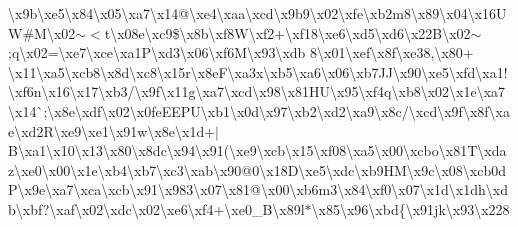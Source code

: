 \begin{DoxyCompactItemize}
\textbackslash{}x9b\textbackslash{}xe5\textbackslash{}x84\textbackslash{}x05\textbackslash{}xa7\textbackslash{}x14@\textbackslash{}xe4\textbackslash{}xaa\textbackslash{}xcd\textbackslash{}x9b9\textbackslash{}x02\textbackslash{}xfe\textbackslash{}xb2m8\textbackslash{}x89\textbackslash{}x04\textbackslash{}x16\+UW\#M\textbackslash{}x02$\sim$$<$t\textbackslash{}x08e\textbackslash{}xc9\$\textbackslash{}x8b\textbackslash{}xf8\+W\textbackslash{}xf2+\textbackslash{}xf18\textbackslash{}xe6\textbackslash{}xd5\textbackslash{}xd6\textbackslash{}x22\+B\textbackslash{}x02$\sim$;q\textbackslash{}x02=\textbackslash{}xe7\textbackslash{}xce\textbackslash{}xa1\+P\textbackslash{}xd3\textbackslash{}x06\textbackslash{}xf6\+M\textbackslash{}x93\textbackslash{}xdb 8\textbackslash{}x01\textbackslash{}xef\textbackslash{}x8f\textbackslash{}xe38,\textbackslash{}x80+ \textbackslash{}x11\textbackslash{}xa5\textbackslash{}xcb8\textbackslash{}x8d\textbackslash{}xc8\textbackslash{}x15r\textbackslash{}x8e\+F\textbackslash{}xa3x\textbackslash{}xb5\textbackslash{}xa6\textbackslash{}x06\textbackslash{}xb7\+J\+J\textbackslash{}x90\textbackslash{}xe5\textbackslash{}xfd\textbackslash{}xa1!\textbackslash{}xf6n\textbackslash{}x16\textbackslash{}x17\textbackslash{}xb3/\textbackslash{}x9f\textbackslash{}x11g\textbackslash{}xa7\textbackslash{}xcd\textbackslash{}x98\textbackslash{}x81\+H\+U\textbackslash{}x95\textbackslash{}xf4q\textbackslash{}xb8\textbackslash{}x02\textbackslash{}x1e\textbackslash{}xa7\textbackslash{}x14\`{};\textbackslash{}x8e\textbackslash{}xdf\textbackslash{}x02\textbackslash{}x0fe\+E\+E\+P\+U\textbackslash{}xb1\textbackslash{}x0d\textbackslash{}x97\textbackslash{}xb2\textbackslash{}xd2\textbackslash{}xa9\textbackslash{}x8c/\textbackslash{}xcd\textbackslash{}x9f\textbackslash{}x8f\textbackslash{}xae\textbackslash{}xd2\+R\textbackslash{}xe9\textquotesingle{}\textbackslash{}xe1\textbackslash{}x91w\textbackslash{}x8e\textbackslash{}x1d+$\vert$B\textbackslash{}xa1\textbackslash{}x10\textbackslash{}x13\textbackslash{}x80\textbackslash{}x8dc\textbackslash{}x94\textbackslash{}x91(\textbackslash{}xe9\textbackslash{}xcb\textbackslash{}x15\textbackslash{}xf08\textbackslash{}xa5\textbackslash{}x00\textbackslash{}xcbo\textbackslash{}x81\+T\textbackslash{}xdaz\textbackslash{}xe0\textbackslash{}x00\textbackslash{}x1e\textbackslash{}xb4\textbackslash{}xb7\textbackslash{}xc3\textbackslash{}xab\textbackslash{}x90@0\textbackslash{}x18\+D\textbackslash{}xe5\textbackslash{}xdc\textbackslash{}xb9\+H\+M\textbackslash{}x9c\textbackslash{}x08\textbackslash{}xcb0d\+P\textbackslash{}x9e\textbackslash{}xa7\textbackslash{}xca\textbackslash{}xcb\textbackslash{}x91\textbackslash{}x983\textbackslash{}x07\textbackslash{}x81@\textbackslash{}x00\textbackslash{}xb6m3\textbackslash{}x84\textbackslash{}xf0\textbackslash{}x07\textbackslash{}x1d\textbackslash{}x1dh\textbackslash{}xdb\textbackslash{}xbf?\textbackslash{}xaf\textbackslash{}x02\textbackslash{}xdc\textbackslash{}x02\textbackslash{}xe6\textbackslash{}xf4+\textbackslash{}xe0\+\_\+\+B\textbackslash{}x89l$\ast$\textbackslash{}x85\textbackslash{}x96\textbackslash{}xbd\{\textbackslash{}x91jk\textbackslash{}x93\textbackslash{}x228 
\end{DoxyCompactItemize}
